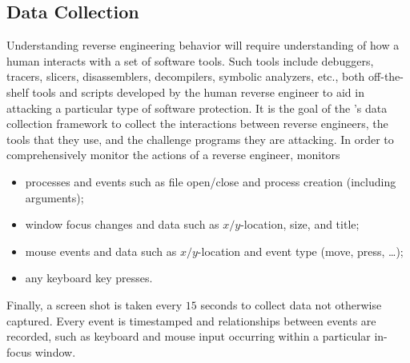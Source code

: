\subsection{Data Collection} \label{datacollection}
Understanding reverse engineering behavior will require understanding of how a human interacts with a set of software tools. Such tools include debuggers, tracers, slicers, disassemblers, decompilers, symbolic analyzers, etc., both off-the-shelf tools and scripts developed by the human reverse engineer to aid in attacking a particular type of software protection. It is the goal of the \revenge's data collection framework to collect the interactions between reverse engineers, the tools that they use, and the challenge programs they are attacking. In order to comprehensively monitor the actions of a reverse engineer, \revenge monitors
\begin{itemize}
\itemsep-.5em
   \item  processes and events such
   as file open/close and process creation (including arguments);
   \item window focus changes and
   data such as $x/y$-location, size, and title;
   \item mouse events and data such as $x/y$-location and event type (move, press, \ldots);
   \item any keyboard key presses.
\end{itemize}
Finally, a screen shot is taken every $15$ seconds to collect data not otherwise captured. Every event is timestamped and relationships between events are recorded, such as keyboard and mouse input occurring within a particular in-focus window.
